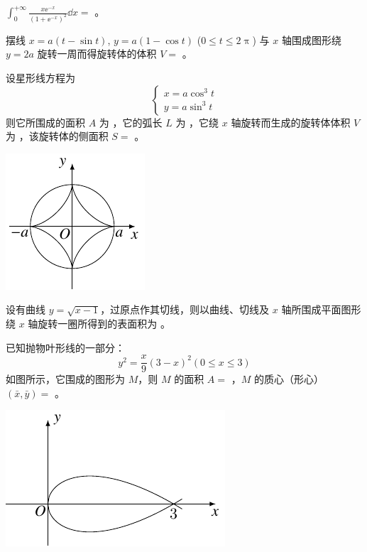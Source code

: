 \begin{ti}
	$\int_0^{+\infty} \frac{x \ee^{-x}}{(1 + \ee^{-x})^2} \dd{x} = $ \hua。
\end{ti}

\begin{ti}
	摆线 $x = a (t - \sin t)$, $y = a(1 - \cos t)$ ($0 \leq t \leq 2 \uppi$) 与 $x$ 轴围成图形绕 $y = 2a$ 旋转一周而得旋转体的体积 $V = $ \hua。
\end{ti}

\begin{ti}
	设星形线方程为
	\[
		\begin{cases}
			x = a \cos^3 t \\
			y = a \sin^3 t
		\end{cases}
	\]
	则它所围成的面积 $A$ 为 \hua，它的弧长 $L$ 为 \hua，它绕 $x$ 轴旋转而生成的旋转体体积 $V$ 为 \hua，该旋转体的侧面积 $S = $ \hua。
	\begin{center}
		\includegraphics{figure/fig71.pdf}
	\end{center}
\end{ti}

\begin{ti}
	设有曲线 $y = \sqrt{x-1}$，过原点作其切线，则以曲线、切线及 $x$ 轴所围成平面图形绕 $x$ 轴旋转一圈所得到的表面积为 \hua。
\end{ti}

\begin{ti}
	已知抛物叶形线的一部分：
	\[
		y^2 = \frac{x}{9} (3-x)^2 (0 \leq x \leq 3)
	\]
	如图所示，它围成的图形为 $M$，则 $M$ 的面积 $A = $ \hua，$M$ 的质心（形心）$(\bar x,\bar y) = $ \hua。
	\begin{center}
		\includegraphics{figure/fig73.pdf}
	\end{center}
\end{ti}

